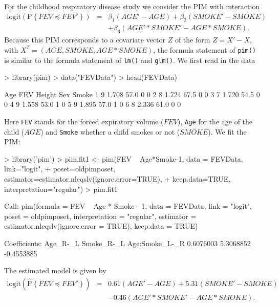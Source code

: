 \documentclass[12pt]{article}
\newcommand{\prob}[1]{\text{P}\left\{#1\right\}}
\newcommand{\hatprob}[1]{\hat{\text{P}}\left\{#1\right\}}
\newcommand{\leqs}{\preccurlyeq}
\begin{document}
For the childhood respiratory disease study we consider the PIM with interaction
\begin{eqnarray*}
\text{logit} \left( \prob{FEV \leqs FEV' } \right) &=& \beta_1 (AGE' - AGE) + \beta_2(SMOKE' - SMOKE) \\ 
												   & &  + \beta_3 (AGE'*SMOKE' - AGE*SMOKE). 
\end{eqnarray*}
Because this PIM corresponds to a covariate vector $Z$ of the form $Z = X' -X$, with $X^T = (AGE, SMOKE, AGE*SMOKE)$, the formula statement of \texttt{pim()} is similar to the formula statement of \texttt{lm()} and \texttt{glm()}. We first read in the data
\begin{Schunk}
\begin{Sinput}
> library(pim)
> data("FEVData")
> head(FEVData)
\end{Sinput}
\begin{Soutput}
  Age   FEV Height Sex Smoke
1   9 1.708   57.0   0     0
2   8 1.724   67.5   0     0
3   7 1.720   54.5   0     0
4   9 1.558   53.0   1     0
5   9 1.895   57.0   1     0
6   8 2.336   61.0   0     0
\end{Soutput}
\end{Schunk}
Here \verb|FEV| stands for the forced expiratory volume ($FEV$), \verb|Age| for the age of the child ($AGE$) and \verb|Smoke| whether a child smokes or not ($SMOKE$). We fit the PIM:
\begin{Schunk}
\begin{Sinput}
> library('pim')
> pim.fit1 <- pim(FEV ~ Age*Smoke-1, data = FEVData, link="logit", 
+   poset=oldpimposet, estimator=estimator.nleqslv(ignore.error=TRUE), 
+   keep.data=TRUE, interpretation="regular")
> pim.fit1
\end{Sinput}
\begin{Soutput}
Call:
pim(formula = FEV ~ Age * Smoke - 1, data = FEVData, link = "logit", 
    poset = oldpimposet, interpretation = "regular", estimator = estimator.nleqslv(ignore.error = TRUE), 
    keep.data = TRUE)

Coefficients:
      Age_R-_L     Smoke_R-_L Age:Smoke_L-_R 
     0.6076003      5.3068852     -0.4553885 
\end{Soutput}
\end{Schunk}
The estimated model is given by
\begin{eqnarray*}
\text{logit} \left( \hatprob{FEV \leqs FEV' } \right) &=& 0.61 (AGE' - AGE) + 5.31(SMOKE' - SMOKE) \\ 
												   & &   -0.46 (AGE'*SMOKE' - AGE*SMOKE). 
\end{eqnarray*}
\end{document}
